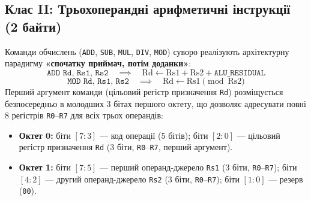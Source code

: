 \documentclass[11pt,a4paper]{article}
\newcommand{\reg}[1]{\texttt{#1}}
\newcommand{\bits}[1]{\texttt{#1}}
\begin{document}
\subsection{Клас II: Трьохоперандні арифметичні інструкції (2 байти)}
Команди обчислень (\texttt{ADD}, \texttt{SUB}, \texttt{MUL}, \texttt{DIV}, \texttt{MOD}) суворо реалізують архітектурну парадигму \textbf{«спочатку приймач, потім доданки»}:
$$\texttt{ADD Rd, Rs1, Rs2} \quad \implies \quad \text{Rd} \leftarrow \text{Rs1} + \text{Rs2} + \reg{ALU\_RESIDUAL}$$
$$\texttt{MOD Rd, Rs1, Rs2} \quad \implies \quad \text{Rd} \leftarrow \text{Rs1} \pmod{\text{Rs2}}$$
Перший аргумент команди (цільовий регістр призначення \reg{Rd}) розміщується безпосередньо в молодших 3 бітах першого октету, що дозволяє адресувати повні 8 регістрів \texttt{R0}--\texttt{R7} для всіх трьох операндів:
\begin{itemize}
  \item \textbf{Октет 0:} біти $[7:3]$ --- код операції (5 бітів); біти $[2:0]$ --- цільовий регістр призначення \reg{Rd} (3 біти, \texttt{R0}--\texttt{R7}, перший аргумент).
  \item \textbf{Октет 1:} біти $[7:5]$ --- перший операнд-джерело \reg{Rs1} (3 біти, \texttt{R0}--\texttt{R7}); біти $[4:2]$ --- другий операнд-джерело \reg{Rs2} (3 біти, \texttt{R0}--\texttt{R7}); біти $[1:0]$ --- резерв (\bits{00}).
\end{itemize}
\end{document}
